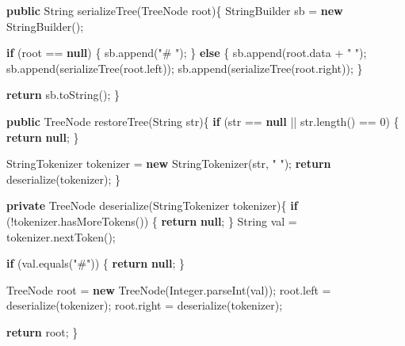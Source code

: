 \documentclass[]{book}
\newenvironment{Shaded}{\begin{snugshade}}{\end{snugshade}}
\newcommand{\BuiltInTok}[1]{#1}
\newcommand{\DecValTok}[1]{\textcolor[rgb]{0.00,0.00,0.81}{#1}}
\newcommand{\FunctionTok}[1]{\textcolor[rgb]{0.00,0.00,0.00}{#1}}
\newcommand{\KeywordTok}[1]{\textcolor[rgb]{0.13,0.29,0.53}{\textbf{#1}}}
\newcommand{\NormalTok}[1]{#1}
\newcommand{\StringTok}[1]{\textcolor[rgb]{0.31,0.60,0.02}{#1}}
\begin{document}
\begin{Shaded}
\begin{Highlighting}[]
\KeywordTok{public} \BuiltInTok{String} \FunctionTok{serializeTree}\NormalTok{(}\BuiltInTok{TreeNode}\NormalTok{ root)\{}
    \BuiltInTok{StringBuilder}\NormalTok{ sb = }\KeywordTok{new} \BuiltInTok{StringBuilder}\NormalTok{();}

    \KeywordTok{if}\NormalTok{ (root == }\KeywordTok{null}\NormalTok{) \{}
\NormalTok{        sb.}\FunctionTok{append}\NormalTok{(}\StringTok{"# "}\NormalTok{);}
\NormalTok{    \} }\KeywordTok{else}\NormalTok{ \{}
\NormalTok{        sb.}\FunctionTok{append}\NormalTok{(root.}\FunctionTok{data}\NormalTok{ + }\StringTok{" "}\NormalTok{);}
\NormalTok{        sb.}\FunctionTok{append}\NormalTok{(}\FunctionTok{serializeTree}\NormalTok{(root.}\FunctionTok{left}\NormalTok{));}
\NormalTok{        sb.}\FunctionTok{append}\NormalTok{(}\FunctionTok{serializeTree}\NormalTok{(root.}\FunctionTok{right}\NormalTok{));}
\NormalTok{    \}}

    \KeywordTok{return}\NormalTok{ sb.}\FunctionTok{toString}\NormalTok{();}
\NormalTok{\}}

\KeywordTok{public} \BuiltInTok{TreeNode} \FunctionTok{restoreTree}\NormalTok{(}\BuiltInTok{String}\NormalTok{ str)\{}
    \KeywordTok{if}\NormalTok{ (str == }\KeywordTok{null}\NormalTok{ || str.}\FunctionTok{length}\NormalTok{() == }\DecValTok{0}\NormalTok{) \{}
        \KeywordTok{return} \KeywordTok{null}\NormalTok{;}
\NormalTok{    \}}

    \BuiltInTok{StringTokenizer}\NormalTok{ tokenizer = }\KeywordTok{new} \BuiltInTok{StringTokenizer}\NormalTok{(str, }\StringTok{" "}\NormalTok{);}
    \KeywordTok{return} \FunctionTok{deserialize}\NormalTok{(tokenizer);}
\NormalTok{\}}

\KeywordTok{private} \BuiltInTok{TreeNode} \FunctionTok{deserialize}\NormalTok{(}\BuiltInTok{StringTokenizer}\NormalTok{ tokenizer)\{}
    \KeywordTok{if}\NormalTok{ (!tokenizer.}\FunctionTok{hasMoreTokens}\NormalTok{()) \{}
        \KeywordTok{return} \KeywordTok{null}\NormalTok{;}
\NormalTok{    \}}
    \BuiltInTok{String}\NormalTok{ val = tokenizer.}\FunctionTok{nextToken}\NormalTok{();}

    \KeywordTok{if}\NormalTok{ (val.}\FunctionTok{equals}\NormalTok{(}\StringTok{"#"}\NormalTok{)) \{}
        \KeywordTok{return} \KeywordTok{null}\NormalTok{;}
\NormalTok{    \}}

    \BuiltInTok{TreeNode}\NormalTok{ root = }\KeywordTok{new} \BuiltInTok{TreeNode}\NormalTok{(}\BuiltInTok{Integer}\NormalTok{.}\FunctionTok{parseInt}\NormalTok{(val));}
\NormalTok{    root.}\FunctionTok{left}\NormalTok{ = }\FunctionTok{deserialize}\NormalTok{(tokenizer);}
\NormalTok{    root.}\FunctionTok{right}\NormalTok{ = }\FunctionTok{deserialize}\NormalTok{(tokenizer);}

    \KeywordTok{return}\NormalTok{ root;}
\NormalTok{\}}
\end{Highlighting}
\end{Shaded}
\end{document}
